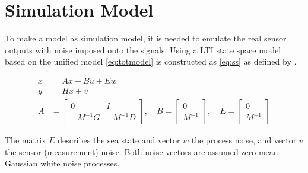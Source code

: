 \chapter{Simulation Model}
\label{ch:simulation-model}

\noindent To make a model as simulation model, it is needed to emulate the real
sensor outputs with noise imposed onto the signals. Using a \ac{LTI}
state space model based on the unified model \vref{eq:totmodel} is
constructed as \vref{eq:ss} as defined by \citep[p. 175]{fossen}.

\begin{subequations}
\begin{align}
	\dot x &=  A x + B u + E w \\
	y &= H x + v \\
	A &=
	\begin{bmatrix}
		0 & I\\ -M^{-1}G & -M^{-1}D
	\end{bmatrix}, \quad
	B = 
	\begin{bmatrix}
		0 \\ M^{-1}
	\end{bmatrix}, \quad
	E =
	\begin{bmatrix}
		0 \\ M^{-1}
	\end{bmatrix}
\end{align}
\label{eq:ss}
\end{subequations}

The matrix $E$ describes the sea state and vector $w$ the process noise, and vector $v$ the sensor (measurement) noise. Both noise
vectors are assumed zero-mean Gaussian white noise processes.



